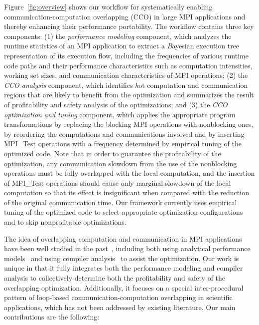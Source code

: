 Figure~\ref{fig:overview} shows our workflow for systematically
enabling communication-computation overlapping (CCO) in large MPI
applications and thereby enhancing their performance portability.  The
workflow contains three key components: (1) the \emph{performance
  modeling} component, which analyzes the runtime statistics of an MPI
application to extract a {\emph Bayesian execution
  tree\cite{jichi:ipdps14}} representation of its execution flow,
including the frequencies of various runtime code paths and their
performance characteristics such as computation intensities, working
set sizes, and communication characteristics of MPI operations; (2)
the \emph{CCO analysis} component, which identifies {\emph hot}
computation and communication regions that are likely to benefit from
the optimization and summarizes the result of profitability and safety
analysis of the optimizations; and (3) the \emph{CCO optimization and
  tuning} component, which applies the appropriate program
transformations by replacing the blocking MPI operations with
nonblocking ones, by reordering the computations and communications
involved and by inserting MPI\_Test operations with a frequency
determined by empirical tuning of the optimized code.  Note that in
order to guarantee the profitability of the optimization, any
communication slowdown from the use of the nonblocking operations must
be fully overlapped with the local computation, and the insertion of
MPI\_Test operations should cause only marginal slowdown of the local
computation so that its effect is insignificant when compared with the
reduction of the original communication time.  Our framework currently
uses empirical tuning of the optimized code to select appropriate
optimization configurations and to skip nonprofitable optimizations.

The idea of overlapping computation and communication in MPI applications have been
well studied in the past~\cite{danalis:sc05,fishgold:ipdps06}, including both using analytical performance
models~\cite{iancu:ppopp07}
and using compiler analysis~\cite{danalis:ics09} to assist the optimization.
Our work is unique in that it fully integrates both the performance modeling and compiler analysis to collectively
determine both the profitability and safety of the overlapping optimization.
Additionally, it
focuses on a special inter-procedural pattern of loop-based
communication-computation overlapping in scientific applications, which has not been addressed
by existing literature. Our main contributions are the following:

